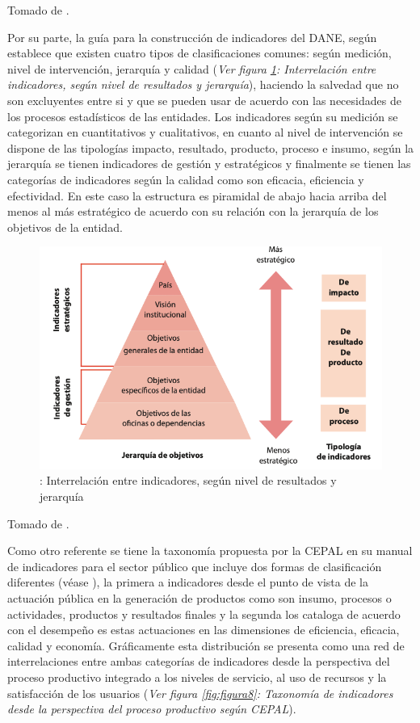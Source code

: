 \documentclass[
]{book}
\begin{document}
Tomado de \citet{sanchez2018guia}.

Por su parte, la guía para la construcción de indicadores del DANE, según \citet{dane2014guia} establece que existen cuatro tipos de clasificaciones comunes: según medición, nivel de intervención, jerarquía y calidad (\emph{Ver figura \ref{fig:figura7}: Interrelación entre indicadores, según nivel de resultados y jerarquía}), haciendo la salvedad que no son excluyentes entre si y que se pueden usar de acuerdo con las necesidades de los procesos estadísticos de las entidades. Los indicadores según su medición se categorizan en cuantitativos y cualitativos, en cuanto al nivel de intervención se dispone de las tipologías impacto, resultado, producto, proceso e insumo, según la jerarquía se tienen indicadores de gestión y estratégicos y finalmente se tienen las categorías de indicadores según la calidad como son eficacia, eficiencia y efectividad. En este caso la estructura es piramidal de abajo hacia arriba del menos al más estratégico de acuerdo con su relación con la jerarquía de los objetivos de la entidad.

\begin{figure}

{\centering \includegraphics[width=0.7\linewidth]{Imagenes/figura_7} 

}

\caption{: Interrelación entre indicadores, según nivel de resultados y jerarquía}\label{fig:figura7}
\end{figure}

Tomado de \citet{dane2014guia}.

Como otro referente se tiene la taxonomía propuesta por la CEPAL en su manual de indicadores para el sector público que incluye dos formas de clasificación diferentes (véase \citet{bonnefoy2005indicadores}), la primera a indicadores desde el punto de vista de la actuación pública en la generación de productos como son insumo, procesos o actividades, productos y resultados finales y la segunda los cataloga de acuerdo con el desempeño es estas actuaciones en las dimensiones de eficiencia, eficacia, calidad y economía. Gráficamente esta distribución se presenta como una red de interrelaciones entre ambas categorías de indicadores desde la perspectiva del proceso productivo integrado a los niveles de servicio, al uso de recursos y la satisfacción de los usuarios (\emph{Ver figura \ref{fig:figura8}: Taxonomía de indicadores desde la perspectiva del proceso productivo según CEPAL}).
\end{document}
